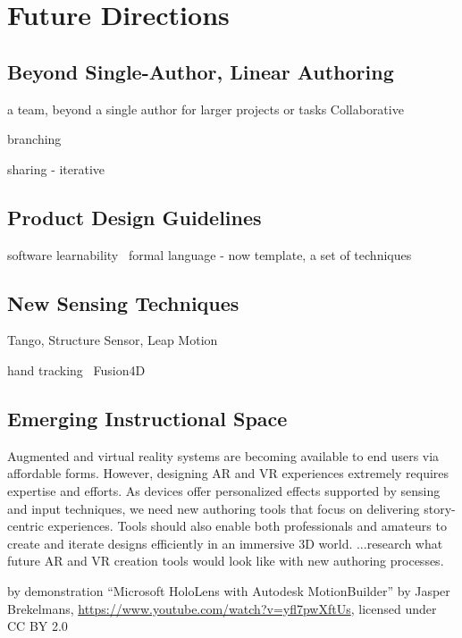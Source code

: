 
\section{Future Directions} %


\subsection{Beyond Single-Author, Linear Authoring}
a team, beyond a single author for larger projects or tasks
Collaborative

branching

sharing - iterative

\subsection{Product Design Guidelines}
software learnability~\cite{Grossman:2009:SSL:1518701.1518803}
formal language
- now template, a set of techniques

\subsection{New Sensing Techniques}
Tango, Structure Sensor, Leap Motion

hand tracking~\cite{taylor-siggraph2016}
Fusion4D~\cite{dou-siggraph2016}

\subsection{Emerging Instructional Space}

Augmented and virtual reality systems are becoming available to end users via affordable forms. However, designing AR and VR experiences extremely requires expertise and efforts. As devices offer personalized effects supported by sensing and input techniques, we need new authoring tools that focus on delivering story-centric experiences. Tools should also enable both professionals and amateurs to create and iterate designs efficiently in an immersive 3D world. ...research what future AR and VR creation tools would look like with new authoring processes.

by demonstration
``Microsoft HoloLens with Autodesk MotionBuilder'' by Jasper Brekelmans, \url{https://www.youtube.com/watch?v=yfl7pwXftUs}, licensed under CC BY 2.0

